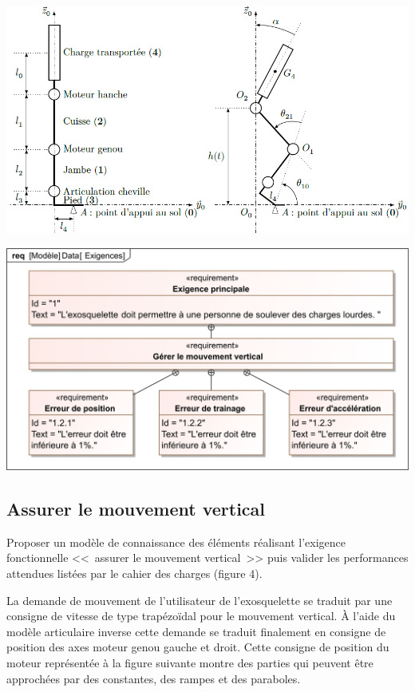 \documentclass[10pt,fleqn]{article} %
\begin{document}
\begin{multicols}{2}
\begin{center}
\includegraphics[width=\linewidth]{images/fig_03}
\end{center}

\begin{center}
\includegraphics[width=\linewidth]{images/Exigences}
\end{center}
\fi

\subsection*{Assurer le mouvement vertical}

\begin{obj}
Proposer un modèle de connaissance des éléments réalisant l’exigence fonctionnelle <<~assurer le mouvement vertical~>> puis valider les performances attendues listées par le cahier des charges (figure 4).
\end{obj}


\ifprof
\else
La demande de mouvement de l’utilisateur de l’exosquelette se traduit par une consigne de vitesse de type
trapézoïdal pour le mouvement vertical. À l’aide du modèle articulaire inverse cette
demande se traduit finalement en consigne de position des axes moteur genou gauche et droit. Cette consigne de position du moteur représentée à la figure suivante montre des parties qui peuvent être approchées par des constantes,
des rampes et des paraboles.


\end{multicols}
\end{document}
